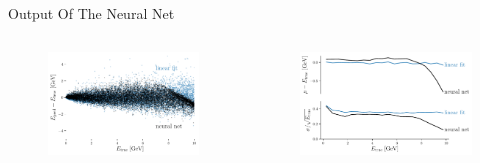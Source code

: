 \documentclass[10pt]{beamer}
\begin{document}
\begin{frame}{Output Of The Neural Net}
  \begin{columns}
    \begin{figure}[htp]
      \includegraphics[width=1.1\textwidth]{../images/data_augment.pdf}
    \end{figure}
    \begin{figure}[htp]
      \includegraphics[width=1.1\textwidth]{../images/data_augment_res.pdf}
    \end{figure}
  \end{columns}
\end{frame}
\end{document}
